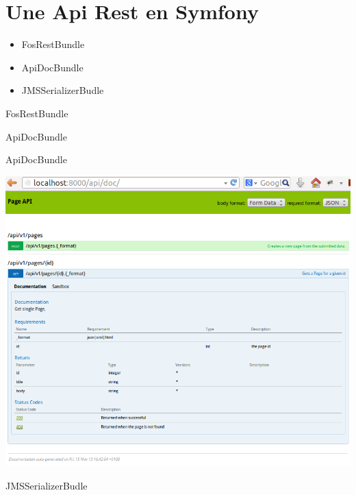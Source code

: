 \documentclass[12pt, francais]{beamer}
\begin{document}
\section{Une Api Rest en Symfony}

\begin{frame}
\end{frame}


\begin{frame}
	\begin{itemize}
	\centering
		\item FosRestBundle
		\item ApiDocBundle
		\item JMSSerializerBudle
	\end{itemize}
\end{frame}

\begin{frame}{FosRestBundle}
	
\end{frame}


\begin{frame}{ApiDocBundle}
	
\end{frame}

\begin{frame}{ApiDocBundle}
	\begin{center}
		\includegraphics[width=.8\linewidth]{Pictures/apidoc.png}
	\end{center}

\end{frame}

\begin{frame}{JMSSerializerBudle}
	
\end{frame}
\end{document}
